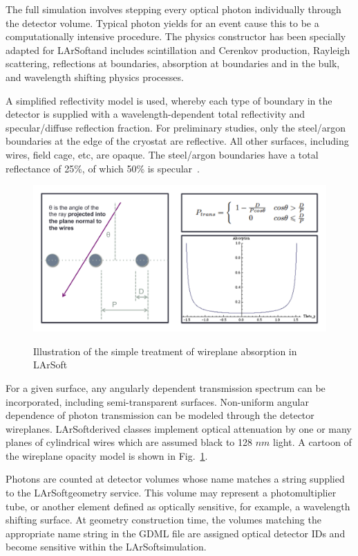 \documentclass[12pt]{elsarticle}
\newcommand{\larsoft}{LArSoft}
\begin{document}
\label{sec:fullopticalsim}
The full simulation involves stepping every optical photon individually through the detector volume.  Typical photon yields for an event cause this to be a computationally intensive procedure. The physics constructor has been specially adapted for \larsoft and includes scintillation and Cerenkov production, Rayleigh scattering, reflections at boundaries, absorption at boundaries and in the bulk, and wavelength shifting physics processes.

A simplified reflectivity model is used, whereby each type of boundary in the detector is supplied with a wavelength-dependent total reflectivity and specular/diffuse reflection fraction.   For  preliminary  studies,  only the  steel/argon boundaries  at  the  edge of the cryostat are  reflective. All  other  surfaces,  including  wires,  field cage,  etc,  are opaque.  The steel/argon boundaries have a total reflectance of 25\%, of which 50\% is specular~\cite{reflectances}.

\begin{figure}[h]
\centering
\caption{Illustration of the simple treatment of wireplane absorption in \larsoft}
\includegraphics[width=6.0in]{./mtrls/imgs/WireplaneTransmissionCartoon.pdf}
\label{fig:wireplaneabs}
\end{figure}

For a given surface, any angularly dependent transmission spectrum can be incorporated, including semi-transparent surfaces.  Non-uniform angular dependence of photon transmission can be modeled through the detector wireplanes.    \larsoft derived classes implement optical attenuation by one or many planes of cylindrical wires which are assumed black to 128 $nm$ light. A cartoon of the wireplane opacity model is shown in Fig.~\ref{fig:wireplaneabs}.

Photons are counted at detector volumes whose name matches a string supplied to the \larsoft geometry service.  This volume may represent a photomultiplier tube, or another element defined as optically sensitive, for example, a wavelength shifting surface. At geometry construction time, the volumes matching the appropriate name string in the GDML file are assigned optical detector IDs and become sensitive within the \larsoft simulation.
\end{document}
